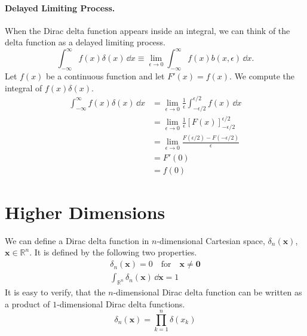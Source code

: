 \paragraph{Delayed Limiting Process.}
When the Dirac delta function appears inside an integral, we can think of the
delta function as a delayed limiting process. 
\[ 
\int_{-\infty}^\infty f(x) \delta(x)\,\dd x \equiv \lim_{\epsilon \to 0} \int_{-\infty}^\infty f(x) b(x, \epsilon)\,\dd x. 
\]
Let $f(x)$ be a continuous function and let $F'(x) = f(x)$.  
We compute the integral of $f(x) \delta(x)$.
\begin{align*}
  \int_{-\infty}^\infty f(x) \delta(x)\,\dd x
  &= \lim_{\epsilon \to 0} \frac{1}{\epsilon} \int_{-\epsilon/2}^{\epsilon/2} f(x)\,\dd x 
  \\
  &= \lim_{\epsilon \to 0} \frac{1}{\epsilon} [F(x)]_{-\epsilon/2}^{\epsilon/2} 
  \\
  &= \lim_{\epsilon \to 0} \frac{F(\epsilon/2) - F(-\epsilon/2)}{\epsilon} 
  \\
  &= F'(0) 
  \\
  &= f(0)
\end{align*}











\section{Higher Dimensions}






We can define a Dirac delta function in $n$-dimensional Cartesian space, 
$\delta_n(\mathbf{x})$, $\mathbf{x} \in \mathbb{R}^n$.
It is defined by the following two properties.
\begin{gather*}
  \delta_n(\mathbf{x}) = 0 
  \quad \mathrm{for} \quad \mathbf{x} \neq \mathbf{0}
  \\
  \int_{\mathbb{R}^n} \delta_n(\mathbf{x}) \,\dd \mathbf{x} = 1
\end{gather*}
It is easy to verify, that the $n$-dimensional Dirac delta function can be 
written as a product of $1$-dimensional Dirac delta functions.
\[
\delta_n(\mathbf{x}) = \prod_{k=1}^n \delta(x_k)
\]





